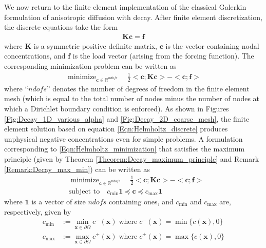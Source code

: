 \documentclass[11pt]{amsart}
\begin{document}
We now return to the finite element implementation of the classical Galerkin formulation 
of anisotropic diffusion with decay. After finite element discretization, the discrete 
equations take the form
\begin{align}
  \label{Eqn:Helmholtz_discrete}
  \boldsymbol{K} \boldsymbol{c} = \boldsymbol{f}
\end{align}
where $\boldsymbol{K}$ is a symmetric positive definite matrix, $\boldsymbol{c}$ is the 
vector containing nodal concentrations, and $\boldsymbol{f}$ is the load vector (arising 
from the forcing function). The corresponding minimization problem can be written as 
\begin{align}
  \label{Eqn:Helmholtz_minimization}
  \mathop{\mbox{minimize}}_{\boldsymbol{c} \in \mathbb{R}^{ndofs}} \quad  \frac{1}{2} 
  <\boldsymbol{c}; \boldsymbol{K}  \boldsymbol{c}> - <\boldsymbol{c}; \boldsymbol{f}>
\end{align}
where ``$ndofs$'' denotes the number of degrees of freedom in the finite element mesh 
(which is equal to the total number of nodes minus the number of nodes at which a Dirichlet 
boundary condition is enforced). As shown in Figures \ref{Fig:Decay_1D_various_alpha} 
and \ref{Fig:Decay_2D_coarse_mesh}, the finite element solution based on equation 
\eqref{Eqn:Helmholtz_discrete} produces unphysical negative concentrations even for 
simple problems. A formulation corresponding to \eqref{Eqn:Helmholtz_minimization} 
that satisfies the maximum principle (given by Theorem \ref{Theorem:Decay_maximum_principle} 
and Remark \ref{Remark:Decay_max_min})  can be written as 
\begin{subequations}
  \label{Eqn:Decay_DMP}
  \begin{align}
    &\mathop{\mbox{minimize}}_{\boldsymbol{c} \in \mathbb{R}^{ndofs}} \quad  
    \frac{1}{2} <\boldsymbol{c}; \boldsymbol{K}  \boldsymbol{c}>  - 
    <\boldsymbol{c}; \boldsymbol{f}> \\
&\mbox{subject to} \quad c_{\mathrm{min}} \boldsymbol{1} \preceq \boldsymbol{c} 
    \preceq c_{\mathrm{max}} \boldsymbol{1} 
  \end{align}
\end{subequations}
where $\boldsymbol{1}$ is a vector of size $ndofs$ containing ones, and 
$c_{\mathrm{min}}$ and $c_{\mathrm{max}}$ are, respectively, given by
\begin{subequations}
  \begin{align}
    c_{\mathrm{min}} &:= \min_{\mathbf{x} \in \partial \Omega} c^{-}(\mathbf{x}) \; 
    \mathrm{where} \; c^{-}(\mathbf{x}) = \min\{c(\mathbf{x}),0\} \\
    c_{\mathrm{max}} &:= \max_{\mathbf{x} \in \partial \Omega} c^{+}(\mathbf{x}) \; 
    \mathrm{where} \; c^{+}(\mathbf{x}) = \max\{c(\mathbf{x}),0\}
  \end{align}
\end{subequations}
\end{document}
